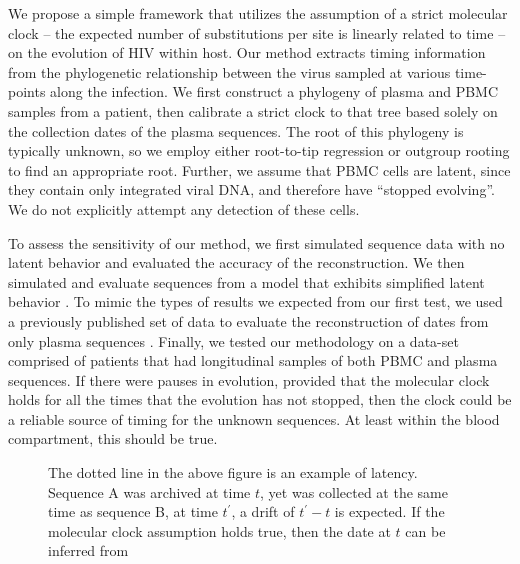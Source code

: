 We propose a simple framework that utilizes the assumption of a strict molecular clock -- the expected number of substitutions per site is linearly related to time \citep{Ho14} --  on the evolution of HIV within host. Our method extracts timing information from the phylogenetic relationship between the virus sampled at various time-points along the infection. We first construct a phylogeny of plasma and PBMC samples from a patient, then calibrate a strict clock to that tree based solely on the collection dates of the plasma sequences. The root of this phylogeny is typically unknown, so we employ either root-to-tip regression or outgroup rooting to find an appropriate root. Further, we assume that PBMC cells are latent, since they contain only integrated viral DNA, and therefore have ``stopped evolving''. We do not explicitly attempt any detection of these cells. 


To assess the sensitivity of our method, we first simulated sequence data with no latent behavior and evaluated the accuracy of the reconstruction. 
We then simulated and evaluate sequences from a model that exhibits simplified latent behavior  \citep{Immonen14}. To mimic the types of results we expected from our first test, we used a previously published set of data to evaluate the reconstruction of dates from only plasma sequences \citep{McCloskey14}. Finally, we tested our methodology on a data-set comprised of patients that had longitudinal samples of both PBMC and plasma sequences.  If there were pauses in evolution, provided that the molecular clock holds for all the times that the evolution has not stopped, then the clock could be a reliable source of timing for the unknown sequences. At least within the blood compartment, this should be true. 

\begin{figure} \label{fig:latenttree}
	\centering
	\scalebox{5}{}
	\caption[Example of latent behavior]{The dotted line in the above figure is an example of latency. 
	Sequence A was archived at time $t$, yet was collected at the same time as sequence B, at time $t^\prime$, a drift of $t^\prime - t$ is expected. 
	If the molecular clock assumption holds true, then the date at $t$ can be inferred from }
\end{figure}
